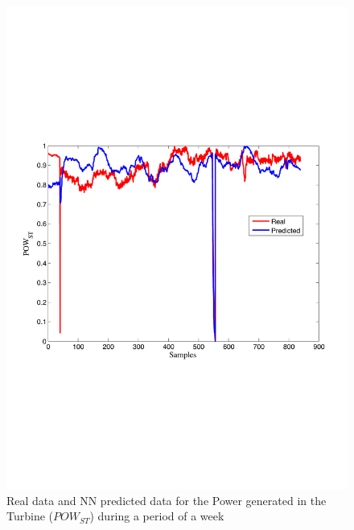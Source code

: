 \begin{figure}
\includegraphics[width=1\textwidth]{nne2bis.pdf}
\caption{Real data and NN predicted data for the Power generated in the Turbine ($POW_{ST}$) during a period of a week}
\label{Pturbine}
\end{figure}




